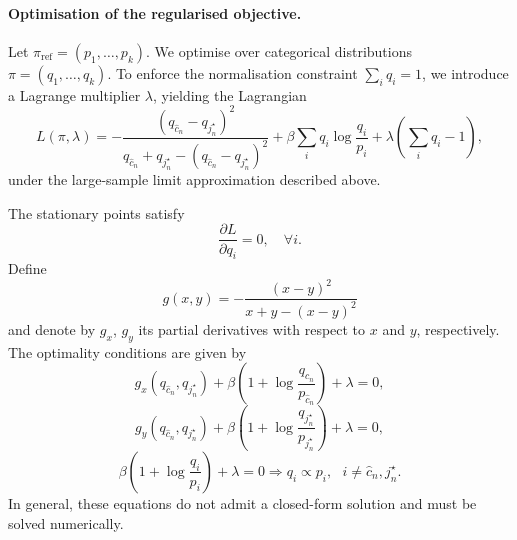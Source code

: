 \paragraph{Optimisation of the regularised objective.} Let $\pi_{\text{ref}} = (p_1, \dots, p_k)$.  We optimise over categorical distributions $\pi = (q_1, \dots, q_k)$.
To enforce the normalisation constraint $\sum_i q_i=1$, we introduce a Lagrange multiplier $\lambda$, yielding the Lagrangian
$$
L(\pi, \lambda) = -\frac{(q_{\hat{c}_n}-q_{j^\star_n})^2}{q_{\hat{c}_n}+q_{j^\star_n}-(q_{\hat{c}_n}-q_{j^\star_n})^2} + \beta \sum_i q_i \log \frac{q_i}{p_i} + \lambda \left( \sum_i q_i - 1 \right),
$$
under the large-sample limit approximation described above.

The stationary points satisfy 
$$
\frac{\partial {L}}{\partial q_i} = 0, \quad \forall i.
$$
Define
$$
g(x,y) = -\frac{(x - y)^2}{x + y - (x - y)^2}
$$
and denote by $g_x$, $g_y$ its partial derivatives with respect to $x$ and $y$, respectively.
The optimality conditions are given by
$$
g_x(q_{\hat{c}_n}, q_{{j}_n^\star}) + \beta \left( 1 + \log \frac{q_{\hat{c}_n}}{p_{\hat{c}_n}} \right) + \lambda = 0,
$$
$$
g_y(q_{\hat{c}_n}, q_{{j}_n^\star}) + \beta \left( 1 + \log \frac{q_{{j}_n^\star}}{p_{j_n^\star}} \right) + \lambda = 0,
$$
$$
\beta \left( 1 + \log \frac{q_{i}}{p_{i}} \right) + \lambda = 0\Longrightarrow q_i\propto p_{i},\ \ \ i\neq \hat{c}_n, j^\star_n.
$$
In general, these equations do not admit a closed-form solution and must be solved numerically.